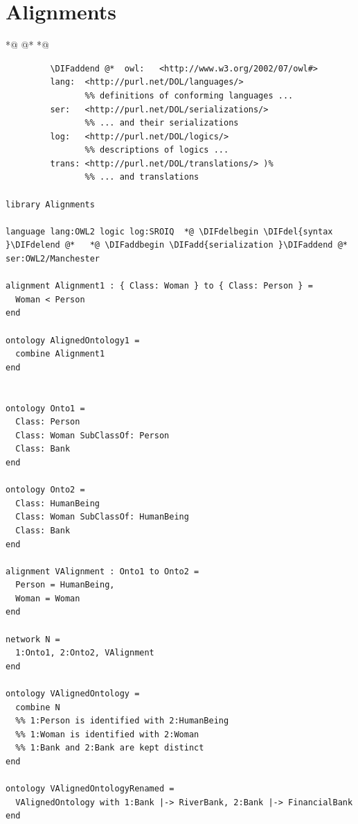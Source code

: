\documentclass[10pt,fleqn,final]{scrreprt}
\newcommand{\sclause}[1]{\section{#1}}
\newcommand{\ssclause}[1]{\subsection{#1}}
\providecommand{\DIFadd}[1]{{\protect\color{blue}\uwave{#1}}} %
\providecommand{\DIFdel}[1]{{\protect\color{red}\sout{#1}}}                      %
\providecommand{\DIFaddbegin}{} %
\providecommand{\DIFaddend}{} %
\providecommand{\DIFdelbegin}{} %
\providecommand{\DIFdelend}{} %
\begin{document}
\DIFdelbegin %
\DIFdelend \DIFaddbegin \sclause{Alignments}\label{ex:alignment}
\DIFaddend {}
 *@ \DIFdelbegin %
         \DIFdelend @*   *@ \DIFaddbegin \begin{lstlisting}[basicstyle=\ttfamily,language=dolText,alsolanguage=OWL2manchester,escapechar=@,mathescape]
%DIF > prefix( :      <http://www.example.org/@alignment@#>
         \DIFaddend @*  owl:   <http://www.w3.org/2002/07/owl#>
         lang:  <http://purl.net/DOL/languages/>
                %% definitions of conforming languages ...
         ser:   <http://purl.net/DOL/serializations/>
                %% ... and their serializations
         log:   <http://purl.net/DOL/logics/>
                %% descriptions of logics ...
         trans: <http://purl.net/DOL/translations/> )%
                %% ... and translations

library Alignments

language lang:OWL2 logic log:SROIQ  *@ \DIFdelbegin \DIFdel{syntax }\DIFdelend @*   *@ \DIFaddbegin \DIFadd{serialization }\DIFaddend @*  ser:OWL2/Manchester

alignment Alignment1 : { Class: Woman } to { Class: Person } =
  Woman < Person
end

ontology AlignedOntology1 =
  combine Alignment1
end


ontology Onto1 =
  Class: Person
  Class: Woman SubClassOf: Person
  Class: Bank
end

ontology Onto2 =
  Class: HumanBeing
  Class: Woman SubClassOf: HumanBeing
  Class: Bank
end

alignment VAlignment : Onto1 to Onto2 =
  Person = HumanBeing,
  Woman = Woman
end

network N =
  1:Onto1, 2:Onto2, VAlignment
end

ontology VAlignedOntology =
  combine N
  %% 1:Person is identified with 2:HumanBeing
  %% 1:Woman is identified with 2:Woman
  %% 1:Bank and 2:Bank are kept distinct
end

ontology VAlignedOntologyRenamed =
  VAlignedOntology with 1:Bank |-> RiverBank, 2:Bank |-> FinancialBank
end

\end{lstlisting}
\end{document}
